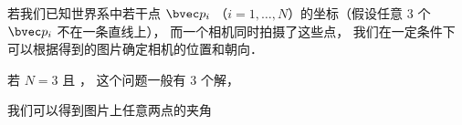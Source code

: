 

若我们已知世界系中若干点 $\bvec p_i$ （$i = 1, \dots, N$）的坐标（假设任意 3 个 $\bvec p_i$ 不在一条直线上）， 而一个相机同时拍摄了这些点， 我们在一定条件下可以根据得到的图片确定相机的位置和朝向．

若 $N = 3$ 且 ， 这个问题一般有 3 个解， 

我们可以得到图片上任意两点的夹角
